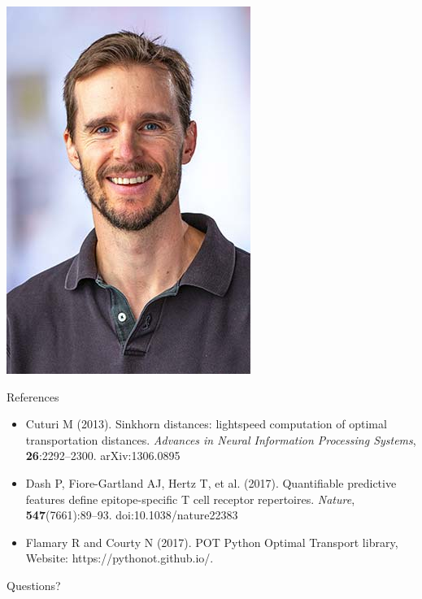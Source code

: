 \documentclass[mathserif,compress,xcolor={dvipsnames}]{beamer}
\renewcommand\;{\,}
\begin{document}
\begin{frame}
\begin{minipage}{0.49\linewidth}
\begin{center}
\includegraphics[width=0.65\linewidth]{Images/Phil.jpg}
\end{center}
\end{minipage}
\end{frame}

\begin{frame}{References}
\small
\begin{itemize}
\item[]
Cuturi M (2013). Sinkhorn distances: lightspeed computation of optimal transportation distances. {\em Advances in Neural Information Processing Systems}, \textbf{26}:2292--2300. arXiv:1306.0895
\bigskip
\item[]
Dash P, Fiore-Gartland AJ, Hertz T, et al. (2017). Quantifiable predictive features define epitope-specific T cell receptor repertoires. {\em Nature}, \textbf{547}(7661):89--93. doi:10.1038/nature22383
\bigskip
\item[]
Flamary R and Courty N (2017). POT Python Optimal Transport library,
Website: https://pythonot.github.io/.
\end{itemize}
\end{frame}

\begin{frame}
\begin{center}
\Huge
Questions?
\end{center}
\end{frame}
\end{document}
